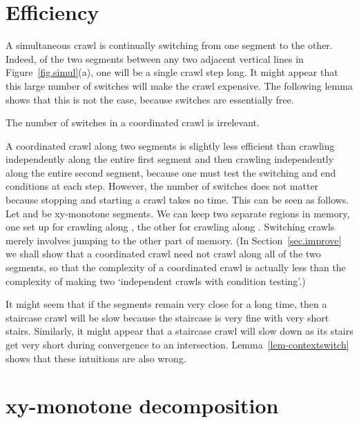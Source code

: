 \section{Efficiency}

A simultaneous crawl is continually switching from one segment to the other.
Indeed, of the two segments between any two adjacent vertical lines
in Figure~\ref{fig.simul}(a), one will be a single crawl step long.
It might appear that this large number of switches will make the crawl expensive.
The following lemma shows that this is not the case, because switches are essentially free.

\begin{lemma}
\label{lem-contextswitch}
The number of switches in a coordinated crawl is irrelevant.
\end{lemma}
A coordinated crawl along two segments is slightly less efficient than
crawling independently along the entire first segment and then crawling 
independently along the entire second segment, because one must test
the switching and end conditions at each step.
However, the number of switches does not matter because 
stopping and starting a crawl takes no time.
This can be seen as follows.
Let  and  be xy-monotone segments.
We can keep two separate regions in memory, one set up for crawling
along , the other for crawling along .
Switching crawls merely involves jumping to the other part of memory. 
(In Section~\ref{sec.improve} we shall show that a coordinated crawl need not crawl along 
all of the two segments,
so that the complexity of a coordinated crawl is actually less than the complexity of making two 
`independent crawls with condition testing'.)
\QED

It might seem that if the segments remain very close for a long time, then a 
staircase crawl will be slow because the staircase is very fine with very short stairs. 
Similarly, it might appear that a staircase crawl will slow down as its stairs 
get very short during convergence to an intersection.
Lemma~\ref{lem-contextswitch} shows that these intuitions are also wrong.

\section{xy-monotone decomposition}
\label{sec-decomp}


